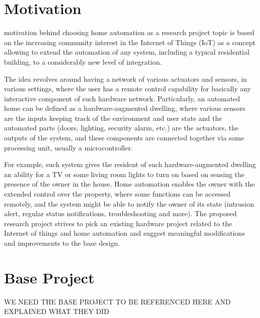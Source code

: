 \documentclass[journal]{IEEEtran}
\begin{document}
\section{Motivation}

% 
 motivation behind choosing home automation as a research project topic is based on the increasing community interest in the Internet of Things (IoT) as a concept allowing to extend the automation of any system, including a typical residential building, to a considerably new level of integration. 

The idea revolves around having a network of various actuators and sensors, in various settings, where the user has a remote control capability for basically any interactive component of such hardware network. Particularly, an automated home can be defined as a hardware-augmented dwelling, where various sensors are the inputs keeping track of the environment and user state and the automated parts (doors, lighting, security alarm, etc.) are the actuators, the outputs of the system, and these components are connected together via some processing unit, usually a microcontroller. 

For example, such system gives the resident of such hardware-augmented dwelling an ability for a TV or some living room lights to turn on based on sensing the presence of the owner in the house. Home automation enables the owner with the extended control over the property, where some functions can be accessed remotely, and the system might be able to notify the owner of its state (intrusion alert, regular status notifications, troubleshooting and more). The proposed research project strives to pick an existing hardware project related to the Internet of things and home automation and suggest meaningful modifications and improvements to the base design.

\section{Base Project}
WE NEED THE BASE PROJECT TO BE REFERENCED HERE AND EXPLAINED WHAT THEY DID
\end{document}
